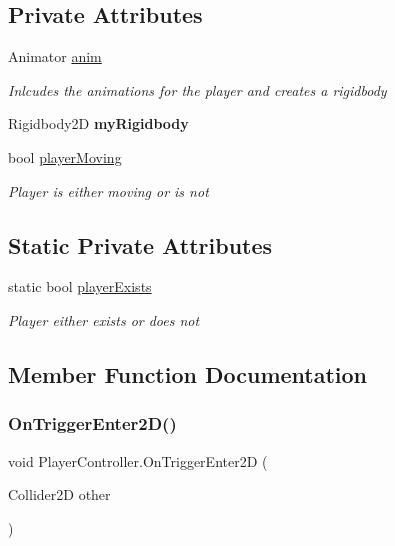 \subsection*{Private Attributes}
\begin{DoxyCompactItemize}
\item 
Animator \mbox{\hyperlink{class_player_controller_ac646d94772588e3393eb5cb9ac02a5c4}{anim}}
\begin{DoxyCompactList}\small\item\em Inlcudes the animations for the player and creates a rigidbody \end{DoxyCompactList}\item 
\mbox{\label{class_player_controller_a87b5271776e29f73db019d63a639c234}} 
Rigidbody2D {\bfseries my\+Rigidbody}
\item 
bool \mbox{\hyperlink{class_player_controller_a15143b0b40abe525495279ea3cd4ba82}{player\+Moving}}
\begin{DoxyCompactList}\small\item\em Player is either moving or is not \end{DoxyCompactList}\end{DoxyCompactItemize}
\subsection*{Static Private Attributes}
\begin{DoxyCompactItemize}
\item 
static bool \mbox{\hyperlink{class_player_controller_aee578ffd54e0e8e2f8149e2d3d1ba036}{player\+Exists}}
\begin{DoxyCompactList}\small\item\em Player either exists or does not \end{DoxyCompactList}\end{DoxyCompactItemize}


\subsection{Member Function Documentation}
\mbox{\label{class_player_controller_a751c7590dfb8e726d1eb3a27d0b197a2}} 
\subsubsection{\texorpdfstring{On\+Trigger\+Enter2\+D()}{OnTriggerEnter2D()}}
{\footnotesize\ttfamily void Player\+Controller.\+On\+Trigger\+Enter2D (\begin{DoxyParamCaption}\item[{Collider2D}]{other }\end{DoxyParamCaption})\hspace{0.3cm}{\ttfamily [private]}}



